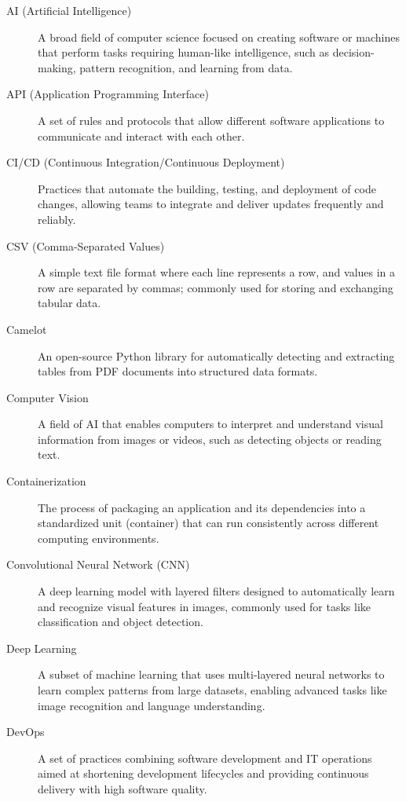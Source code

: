 \documentclass[11pt,a4paper]{article}
\begin{document}
\begin{description}

  \item[AI (Artificial Intelligence)] A broad field of computer science focused on creating software or machines that perform tasks requiring human-like intelligence, such as decision-making, pattern recognition, and learning from data.

  \item[API (Application Programming Interface)] A set of rules and protocols that allow different software applications to communicate and interact with each other.

  \item[CI/CD (Continuous Integration/Continuous Deployment)] Practices that automate the building, testing, and deployment of code changes, allowing teams to integrate and deliver updates frequently and reliably.

  \item[CSV (Comma-Separated Values)] A simple text file format where each line represents a row, and values in a row are separated by commas; commonly used for storing and exchanging tabular data.

  \item[Camelot] An open-source Python library for automatically detecting and extracting tables from PDF documents into structured data formats.

  \item[Computer Vision] A field of AI that enables computers to interpret and understand visual information from images or videos, such as detecting objects or reading text.

  \item[Containerization] The process of packaging an application and its dependencies into a standardized unit (container) that can run consistently across different computing environments.

  \item[Convolutional Neural Network (CNN)] A deep learning model with layered filters designed to automatically learn and recognize visual features in images, commonly used for tasks like classification and object detection.

  \item[Deep Learning] A subset of machine learning that uses multi-layered neural networks to learn complex patterns from large datasets, enabling advanced tasks like image recognition and language understanding.

  \item[DevOps] A set of practices combining software development and IT operations aimed at shortening development lifecycles and providing continuous delivery with high software quality.


\end{description}
\end{document}
